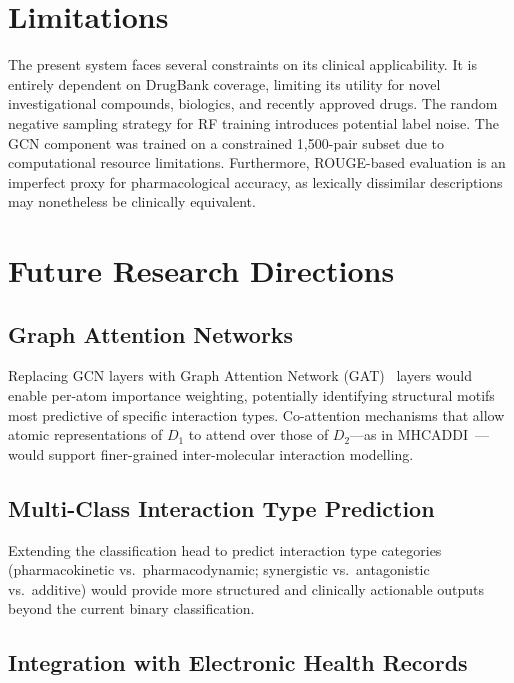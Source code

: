 \documentclass[12pt,a4paper,oneside]{report}
\begin{document}
\section{Limitations}

The present system faces several constraints on its clinical applicability. It is entirely
dependent on DrugBank coverage, limiting its utility for novel investigational compounds,
biologics, and recently approved drugs. The random negative sampling strategy for RF training
introduces potential label noise. The GCN component was trained on a constrained 1,500-pair
subset due to computational resource limitations. Furthermore, ROUGE-based evaluation is an
imperfect proxy for pharmacological accuracy, as lexically dissimilar descriptions may
nonetheless be clinically equivalent.

\section{Future Research Directions}

\subsection{Graph Attention Networks}

Replacing GCN layers with Graph Attention Network (GAT)~\cite{velickovic2018graph} layers
would enable per-atom importance weighting, potentially identifying structural motifs most
predictive of specific interaction types. Co-attention mechanisms that allow atomic
representations of $D_1$ to attend over those of $D_2$---as in MHCADDI~\cite{deac2019drug}---
would support finer-grained inter-molecular interaction modelling.

\subsection{Multi-Class Interaction Type Prediction}

Extending the classification head to predict interaction type categories (pharmacokinetic
vs.\ pharmacodynamic; synergistic vs.\ antagonistic vs.\ additive) would provide more
structured and clinically actionable outputs beyond the current binary classification.

\subsection{Integration with Electronic Health Records}
\end{document}
